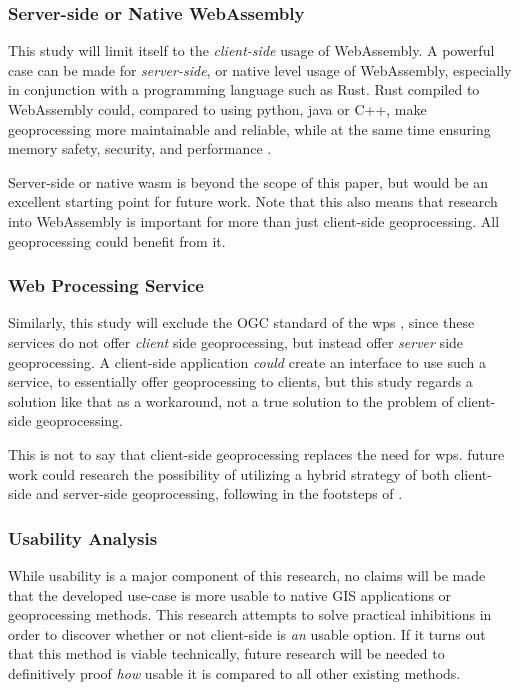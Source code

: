 \subsubsection*{Server-side or Native WebAssembly} %

This study will limit itself to the \emph{client-side} usage of WebAssembly. 
A powerful case can be made for \emph{server-side}, or native level usage of WebAssembly, especially in conjunction with a programming language such as Rust. 
Rust compiled to WebAssembly could, compared to using python, java or C++, make geoprocessing more maintainable and reliable, while at the same time ensuring memory safety, security, and performance \cite{clack_standardizing_2019}. 

Server-side or native wasm is beyond the scope of this paper, but would be an excellent starting point for future work. Note that this also means that research into WebAssembly is important for more than just client-side geoprocessing. All geoprocessing could benefit from it.



\subsubsection*{Web Processing Service} %

Similarly, this study will exclude the OGC standard of the \ac{wps} \cite{ogc_web_2015}, since these services do not offer \emph{client} side geoprocessing, but instead offer \emph{server} side geoprocessing. A client-side application \textit{could} create an interface to use such a service, to essentially offer geoprocessing to clients, but this study regards a solution like that as a workaround, not a true solution to the problem of client-side geoprocessing. 

This is not to say that client-side geoprocessing replaces the need for \ac{wps}. 
future work could research the possibility of utilizing a hybrid strategy of both client-side and server-side geoprocessing, following in the footsteps of \cite{panidi_hybrid_2015}. 


\subsubsection*{Usability Analysis} %

While usability is a major component of this research, no claims will be made that the developed use-case is more usable to native GIS applications or geoprocessing methods. This research attempts to solve practical inhibitions in order to discover whether or not client-side is \emph{an} usable option. If it turns out that this method is viable technically, future research will be needed to definitively proof \emph{how} usable it is compared to all other existing methods.  

